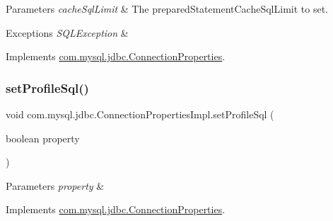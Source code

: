 \begin{DoxyParams}{Parameters}
{\em cache\+Sql\+Limit} & The prepared\+Statement\+Cache\+Sql\+Limit to set. \\
\hline
\end{DoxyParams}

\begin{DoxyExceptions}{Exceptions}
{\em S\+Q\+L\+Exception} & \\
\hline
\end{DoxyExceptions}


Implements \mbox{\hyperlink{interfacecom_1_1mysql_1_1jdbc_1_1_connection_properties_a7cf7fc262516d73e70ac5dbba0d6a510}{com.\+mysql.\+jdbc.\+Connection\+Properties}}.

\mbox{\label{classcom_1_1mysql_1_1jdbc_1_1_connection_properties_impl_a0b1cfb3232b57decb11d935b913e1187}} 
\subsubsection{\texorpdfstring{set\+Profile\+Sql()}{setProfileSql()}}
{\footnotesize\ttfamily void com.\+mysql.\+jdbc.\+Connection\+Properties\+Impl.\+set\+Profile\+Sql (\begin{DoxyParamCaption}\item[{boolean}]{property }\end{DoxyParamCaption})}


\begin{DoxyParams}{Parameters}
{\em property} & \\
\hline
\end{DoxyParams}


Implements \mbox{\hyperlink{interfacecom_1_1mysql_1_1jdbc_1_1_connection_properties_a6e32297fa42ce676613c35580365416a}{com.\+mysql.\+jdbc.\+Connection\+Properties}}.

\mbox{\label{classcom_1_1mysql_1_1jdbc_1_1_connection_properties_impl_a117d473f1836b3b64201c0cf080afe05}} 
